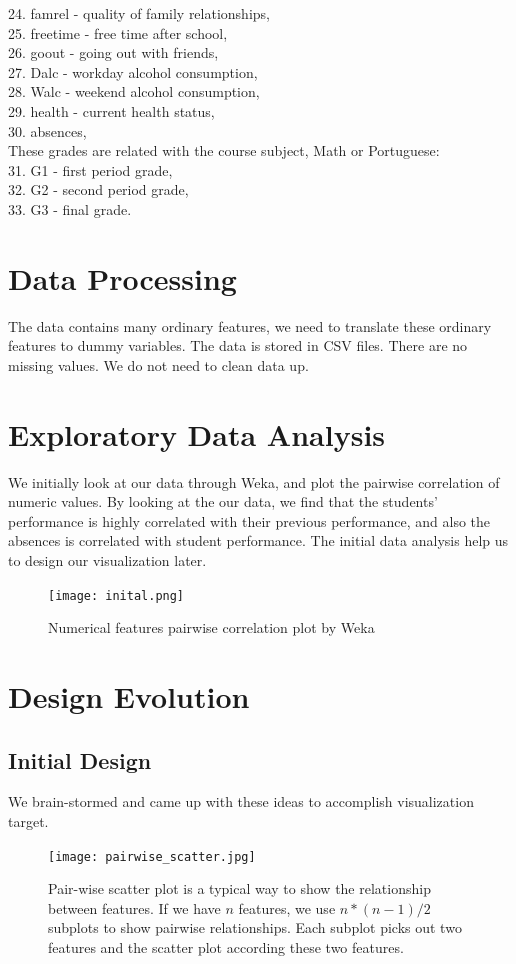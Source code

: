 \documentclass{article}
\begin{document}
24. famrel - quality of family relationships, \\
25. freetime - free time after school, \\
26. goout - going out with friends,\\
27. Dalc - workday alcohol consumption,\\ 
28. Walc - weekend alcohol consumption,\\ 
29. health - current health status, \\
30. absences, \\
These grades are related with the course subject, Math or Portuguese: \\
31. G1 - first period grade, \\
32. G2 - second period grade,\\ 
33. G3 - final grade. \\

\section{Data Processing}
The data contains many ordinary features, we need to translate these ordinary features to dummy variables. The data is stored in CSV files. There are no missing values. We do not need to clean data up.

\section{Exploratory Data Analysis}
We initially look at our data through Weka, and plot the pairwise correlation of numeric values. By looking at the our data, we find that the students' performance is highly correlated with their previous performance, and also the absences is correlated with student performance. The initial data analysis help us to design our visualization later.

\begin{figure}[H]
\centering
\texttt{[image: inital.png]}
\caption{Numerical features pairwise correlation plot by Weka}
\end{figure}

\section{Design Evolution}
\subsection{Initial Design}
We brain-stormed and came up with these ideas to accomplish visualization target.
\begin{figure}[H]
\centering
\texttt{[image: pairwise\_scatter.jpg]}
\caption{Pair-wise scatter plot is a typical way to show the relationship between features. If we have $n$ features, we use $n*(n-1)/2$ subplots to show pairwise relationships. Each subplot picks out two features and the scatter plot according these two features.}
\end{figure}
\end{document}
